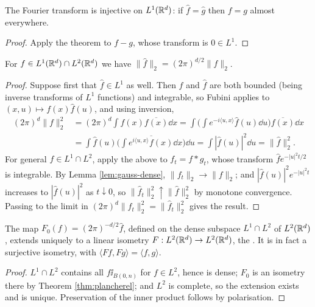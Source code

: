 \documentclass[a4paper]{scrartcl}
\newcommand{\ip}[2]{\langle #1, #2 \rangle}
\newcommand{\ind}{\ii}
\begin{document}
\begin{corollary}
	The Fourier transform is injective on $L^1(\mathbb{R}^d)$: if $\hat f = \hat g$ then $f = g$ almost everywhere.
\end{corollary}
\begin{proof}
	Apply the theorem to $f - g$, whose transform is $0 \in L^1$.
\end{proof}

\begin{theorem}\label{thm:plancherel}
	For $f \in L^1(\mathbb{R}^d)\cap L^2(\mathbb{R}^d)$ we have $\|\hat f\|_2 = (2\pi)^{d/2}\|f\|_2$.
\end{theorem}
\begin{proof}
	Suppose first that $\hat f \in L^1$ as well. Then $f$ and $\hat f$ are both bounded (being inverse transforms of $L^1$ functions) and integrable, so Fubini applies to $(x,u)\mapsto f(x)\hat f(u)$, and using inversion,
	\begin{align*}
		(2\pi)^d\|f\|_2^2 &= (2\pi)^d\int f(x)\overline{f(x)}\dd x = \int\Big(\int e^{-i\ip{u}{x}}\hat f(u)\dd u\Big)\overline{f(x)}\dd x\\
		&= \int \hat f(u)\overline{\Big(\int e^{i\ip{u}{x}}f(x)\dd x\Big)}\dd u = \int|\hat f(u)|^2\dd u = \|\hat f\|_2^2.
	\end{align*}
	For general $f \in L^1\cap L^2$, apply the above to $f_t = f * g_t$, whose transform $\hat f e^{-|u|^2t/2}$ is integrable. By Lemma \ref{lem:gauss-dense}, $\|f_t\|_2 \to \|f\|_2$; and $|\hat f(u)|^2e^{-|u|^2t}$ increases to $|\hat f(u)|^2$ as $t\downarrow0$, so $\|\hat f_t\|_2^2 \uparrow \|\hat f\|_2^2$ by monotone convergence. Passing to the limit in $(2\pi)^d\|f_t\|_2^2 = \|\hat f_t\|_2^2$ gives the result.
\end{proof}

\begin{corollary}
	The map $F_0(f)=(2\pi)^{-d/2}\hat f$, defined on the dense subspace $L^1\cap L^2$ of $L^2(\mathbb{R}^d)$, extends uniquely to a linear isometry $F : L^2(\mathbb{R}^d)\to L^2(\mathbb{R}^d)$, the . It is in fact a surjective isometry, with $\ip{Ff}{Fg}=\ip{f}{g}$.
\end{corollary}
\begin{proof}
	$L^1 \cap L^2$ contains all $f\ind_{B(0,n)}$ for $f \in L^2$, hence is dense; $F_0$ is an isometry there by Theorem \ref{thm:plancherel}; and $L^2$ is complete, so the extension exists and is unique. Preservation of the inner product follows by polarisation.
\end{proof}
\end{document}
